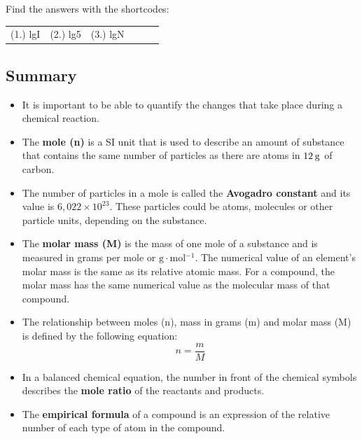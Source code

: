\par {} Find the answers with the shortcodes:
 \par \begin{tabular}[h]{cccccc}
 (1.) lgI  &  (2.) lg5  &  (3.) lgN  & \end{tabular}
            \subsection{ Summary}
            \nopagebreak
      \label{m38712*id285735}\begin{itemize}[noitemsep]
            \label{m38712*uid107}\item It is important to be able to quantify the changes that take place during a chemical reaction.
\label{m38712*uid108}\item The \textbf{mole (n)} is a SI unit that is used to describe an amount of substance that contains the same number of particles as there are atoms in $12\phantom{\rule{2pt}{0ex}}\mathrm{g}$ of carbon.
\label{m38712*uid109}\item The number of particles in a mole is called the \textbf{Avogadro constant} and its value is $6,022\ensuremath{\times}{10}^{23}$. These particles could be atoms, molecules or other particle units, depending on the substance.
\label{m38712*uid110}\item The \textbf{molar mass (M)} is the mass of one mole of a substance and is measured in grams per mole or $\mathrm{g}\ensuremath{\cdot}\mathrm{mol}{}^{-1}$. The numerical value of an element's molar mass is the same as its relative atomic mass. For a compound, the molar mass has the same numerical value as the molecular mass of that compound.
\label{m38712*uid111}\item The relationship between moles (n), mass in grams (m) and molar mass (M) is defined by the following equation:
\label{m38712*id285862}\nopagebreak\noindent{}
    \begin{equation}
    n=\frac{m}{M}\tag{18.53}
      \end{equation}
    \label{m38712*uid112}\item In a balanced chemical equation, the number in front of the chemical symbols describes the \textbf{mole ratio} of the reactants and products.
\label{m38712*uid113}\item The \textbf{empirical formula} of a compound is an expression of the relative number of each type of atom in the compound.

\end{itemize}
